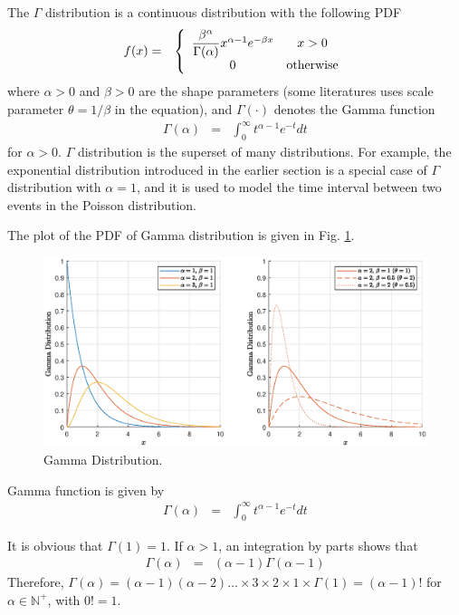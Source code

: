 The $\Gamma$ distribution is a continuous distribution with the following PDF
\begin{eqnarray}
  f(x) &=& \left\{\begin{array}{cc}
                    \dfrac{\beta^\alpha}{\Gamma(\alpha)}x^{\alpha-1}e^{-\beta x} & x > 0 \\
                    0 & \textup{otherwise}
                  \end{array}\right. \label{eq:gammapdf}
\end{eqnarray}
where $\alpha>0$ and $\beta>0$ are the shape parameters (some literatures uses scale parameter $\theta = 1/\beta$ in the equation), and $\Gamma(\cdot)$ denotes the Gamma function
\begin{eqnarray}
  \Gamma(\alpha) &=& \int_{0}^{\infty}t^{\alpha-1}e^{-t}dt \nonumber
\end{eqnarray}
for $\alpha > 0$. $\Gamma$ distribution is the superset of many distributions. For example, the exponential distribution introduced in the earlier section is a special case of $\Gamma$ distribution with $\alpha=1$, and it is used to model the time interval between two events in the Poisson distribution.

The plot of the PDF of Gamma distribution is given in Fig. \ref{fig:gamma_pdf}.
\begin{figure}
	\centering
	\includegraphics[width=350pt]{chapters/part-1/figures/gamma_pdf.eps}
	\caption{Gamma Distribution.} \label{fig:gamma_pdf}
\end{figure}

\begin{shortbox}

Gamma function is given by
\begin{eqnarray}
  \Gamma(\alpha) &=& \int_{0}^{\infty}t^{\alpha-1}e^{-t}dt \nonumber
\end{eqnarray}

It is obvious that $\Gamma(1)=1$. If $\alpha > 1$, an integration by parts shows that
\begin{eqnarray}
  \Gamma(\alpha) &=& (\alpha-1)\Gamma(\alpha-1) \nonumber
\end{eqnarray}
Therefore, $\Gamma(\alpha)=(\alpha-1)(\alpha-2)\ldots \times 3 \times 2 \times 1 \times \Gamma(1) = (\alpha-1)!$ for $\alpha \in \mathbb{N}^+$, with $0!=1$.

\end{shortbox}

